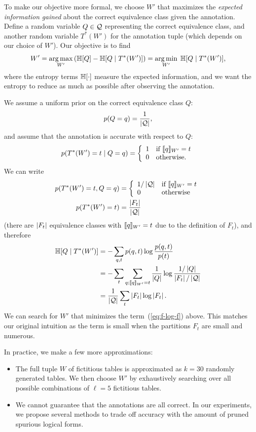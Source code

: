 To make our objective more formal,
we choose $W'$ that maximizes
the \emph{expected information gained}
about the correct equivalence class given the annotation.
Define a random variable $Q \in \mathcal{Q}$
representing the correct equivalence class,
and another random variable $T^*(W')$
for the annotation tuple
(which depends on our choice of $W'$).
Our objective is to find
\begin{equation}
W'
= \operatorname*{arg\,max}_{W'} \left( \mathbb{H}[Q] - \mathbb{H}[Q \mid T^*(W')] \right)
= \operatorname*{arg\,min}_{W'}\;\mathbb{H}[Q \mid T^*(W')],
\end{equation}
where the entropy terms $\mathbb{H}[\cdot]$
measure the expected information,
and we want the entropy to reduce as much as possible
after observing the annotation.

We assume a uniform prior on the correct equivalence class $Q$:
\begin{equation}
p(Q = q) = \frac{1}{\left| \mathcal{Q}\right|},
\end{equation}
and assume that the annotation is accurate with respect to $Q$:
\begin{equation}
p(T^*(W') = t \mid Q = q) = \left\{ \begin{array}{ll} 
1 &\mbox{if $\llbracket{q}\rrbracket_{W'} = t$} \\
0 &\mbox{otherwise}. \end{array} \right.
\end{equation}
We can write
\begin{align}
p(T^*(W') = t, Q = q) &= \left\{ \begin{array}{ll} 
1/\left| \mathcal{Q}\right| &\mbox{if $\llbracket{q}\rrbracket_{W'} = t$} \\
0 &\mbox{otherwise} \end{array} \right. \\
p(T^*(W') = t) &= \frac{\left| F_t\right|}{\left| \mathcal{Q}\right|}
\end{align}
(there are $\left| F_t\right|$ equivalence classes with
$\llbracket{q}\rrbracket_{W'} = t$ due to the definition of $F_t$),
and therefore
\begin{align}
\mathbb{H}[Q \mid T^*(W')]
&= -\sum_{q,t}p(q,t)\log \frac{p(q,t)}{p(t)} \\
&= -\sum_t \sum_{q; \llbracket{q}\rrbracket_{W'} = t}
\frac{1}{\left| Q\right|}
\log \frac{1/\left| Q\right|}{\left| F_t\right|/\left| \mathcal{Q}\right|} \\
&= \frac{1}{\left| \mathcal{Q}\right|} \sum_t \left| F_t\right|\log \left| F_t\right|.
\label{eq:f-log-f}
\end{align}
We can search for $W'$ that minimizes
the term~(\ref{eq:f-log-f}) above.
This matches our original intuition
as the term is small
when the partitions $F_t$ are small and numerous.

In practice, we make a few more approximations:
\begin{itemize}
\item The full tuple $W$ of fictitious tables
is approximated as $k = 30$ randomly generated tables.
We then choose $W'$
by exhaustively searching over all possible combinations
of $\ell = 5$ fictitious tables.
\item We cannot guarantee that the annotations are all correct.
In our experiments, we propose several methods to trade off
accuracy with the amount of pruned spurious logical forms.
\end{itemize}

